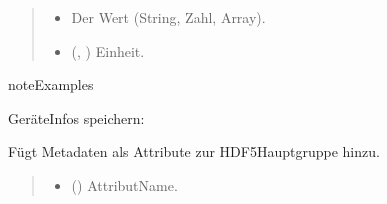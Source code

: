 \documentclass[letterpaper,10pt,english]{sphinxmanual}
\begin{document}
\begin{fulllineitems}
\begin{fulllineitems}
\begin{quote}
\begin{description}
\begin{itemize}
\item {} 
\sphinxAtStartPar
{} \textendash{} Der Wert (String, Zahl, Array).

\item {} 
\sphinxAtStartPar
{} (, ) \textendash{} Einheit.

\end{itemize}

\end{description}\end{quote}

\begin{sphinxadmonition}{note}{Examples}

\sphinxAtStartPar
Geräte\sphinxhyphen{}Infos speichern:

\begin{sphinxVerbatim}[commandchars=\\\{\}]
 
  
\end{sphinxVerbatim}
\end{sphinxadmonition}

\end{fulllineitems}


\begin{fulllineitems}
\label{\detokenize{modulab/export_manager:modules.export.ExportManager.ExportManager.add_group_attribute}}
\pysigstartsignatures
\pysiglinewithargsret
{}
{\sphinxparamcomma {}}
{}
\pysigstopsignatures
\sphinxAtStartPar
Fügt Metadaten als Attribute zur HDF5\sphinxhyphen{}Hauptgruppe hinzu.
\begin{quote}\begin{description}
\begin{itemize}
\item {} 
\sphinxAtStartPar
{} () \textendash{} Attribut\sphinxhyphen{}Name.


\end{itemize}
\end{description}
\end{quote}
\end{fulllineitems}
\end{fulllineitems}
\end{document}
